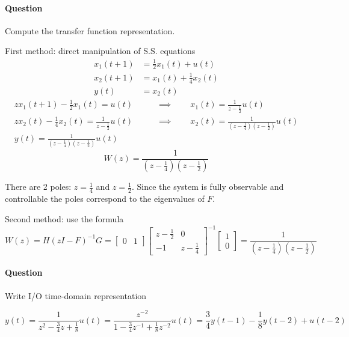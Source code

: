 \begin{exercise}
    \paragraph{Question} Compute the transfer function representation.

    First method: direct manipulation of S.S. equations
    \begin{align*}
        x_1(t+1) &= \frac{1}{2}x_1(t) + u(t) \\
        x_2(t+1) &= x_1(t) + \frac{1}{4}x_2(t) \\
        y(t) &= x_2(t)
    \end{align*}
    \begin{align*}
        zx_1(t+1) - \frac{1}{2}x_1(t) = u(t) \qquad &\implies \qquad x_1(t) = \frac{1}{z-\frac{1}{2}}u(t) \\
        zx_2(t) - \frac{1}{4}x_2(t) = \frac{1}{z-\frac{1}{2}}u(t) \qquad &\implies \qquad x_2(t) = \frac{1}{(z-\frac{1}{4})(z-\frac{1}{2})}u(t) \\
        y(t) = \frac{1}{(z-\frac{1}{4})(z-\frac{1}{2})}u(t)
    \end{align*}
    \[
        W(z) = \frac{1}{(z-\frac{1}{4})(z-\frac{1}{2})}
    \]

    There are 2 poles: $z=\frac{1}{4}$ and $z=\frac{1}{2}$. Since the system is fully observable and controllable the poles correspond to the eigenvalues of $F$.

    Second method: use the formula
    \[
        W(z) = H(zI-F)^{-1}G = \begin{bmatrix}
            0 & 1
        \end{bmatrix} \begin{bmatrix}
            z-\frac{1}{2} & 0 \\
            -1 & z-\frac{1}{4}
        \end{bmatrix}^{-1} \begin{bmatrix}
            1 \\ 0
        \end{bmatrix} = \frac{1}{(z-\frac{1}{4})(z-\frac{1}{2})}
    \]

    \paragraph{Question} Write I/O time-domain representation

    \[
        y(t) = \frac{1}{z^2-\frac{3}{4}z+\frac{1}{8}}u(t) = \frac{z^{-2}}{1-\frac{3}{4}z^{-1}+\frac{1}{8}z^{-2}}u(t) = \frac{3}{4}y(t-1) - \frac{1}{8}y(t-2) + u(t-2)
    \]


\end{exercise}
